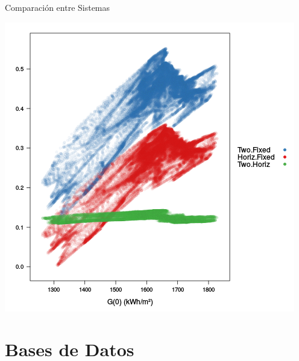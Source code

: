 \documentclass[xcolor={usenames,svgnames,dvipsnames}]{beamer}
\begin{document}
\begin{frame}[label={sec:org3083682}]{Comparación entre Sistemas}
\begin{center}
\includegraphics[width=.9\linewidth]{../figs/compSystemsG0.png}
\end{center}
\end{frame}
\section{Bases de Datos}
\label{sec:org2e47b83}
\end{document}
